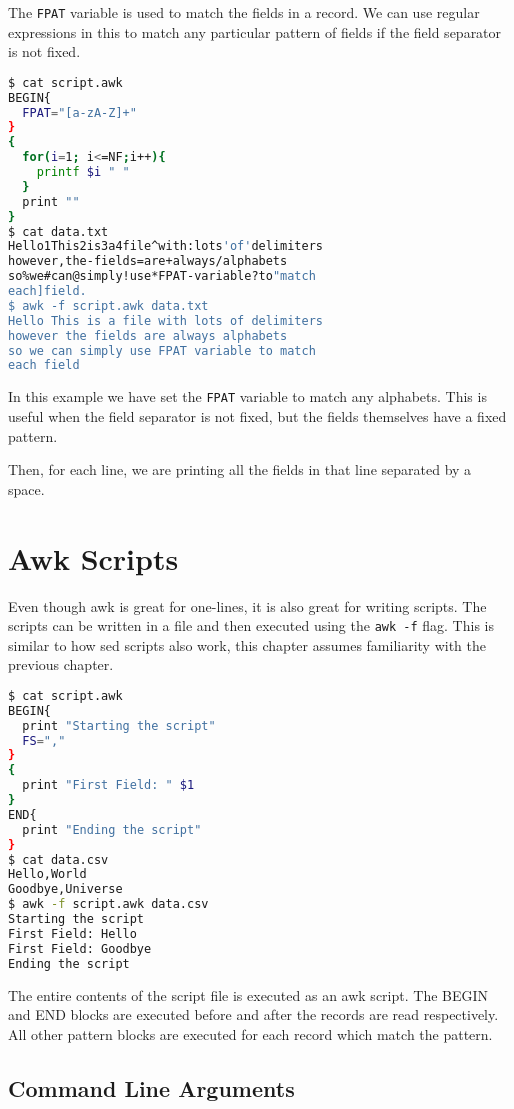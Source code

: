 The \lstinline|FPAT| variable is used to match the fields in a record. We can use regular expressions in this to match any particular pattern of fields if the field separator is not fixed.

\begin{lstlisting}[language=bash]
$ cat script.awk
BEGIN{
  FPAT="[a-zA-Z]+"
}
{
  for(i=1; i<=NF;i++){
    printf $i " "
  }
  print ""
}
$ cat data.txt
Hello1This2is3a4file^with:lots'of'delimiters
however,the-fields=are+always/alphabets
so%we#can@simply!use*FPAT-variable?to"match
each]field.
$ awk -f script.awk data.txt
Hello This is a file with lots of delimiters
however the fields are always alphabets
so we can simply use FPAT variable to match
each field
\end{lstlisting}

In this example we have set the \lstinline|FPAT| variable to match any alphabets. This is useful when the field separator is not fixed, but the fields themselves have a fixed pattern.

Then, for each line, we are printing all the fields in that line separated by a space.

\section{Awk Scripts}

Even though awk is great for one-lines, it is also great for writing scripts. The scripts can be written in a file and then executed using the \lstinline|awk -f| flag.
This is similar to how sed scripts also work, this chapter assumes familiarity with the previous chapter.

\begin{lstlisting}[language=bash]
$ cat script.awk
BEGIN{
  print "Starting the script"
  FS=","
}
{
  print "First Field: " $1
}
END{
  print "Ending the script"
}
$ cat data.csv
Hello,World
Goodbye,Universe
$ awk -f script.awk data.csv
Starting the script
First Field: Hello
First Field: Goodbye
Ending the script
\end{lstlisting}

The entire contents of the script file is executed as an awk script. The BEGIN and END blocks are executed before and after the records are read respectively. All other pattern blocks
are executed for each record which match the pattern.

\subsection{Command Line Arguments}

